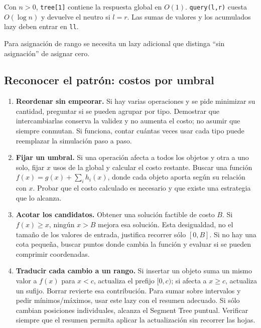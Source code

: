 Con $n>0$, \texttt{tree[1]} contiene la respuesta global en $O(1)$.
\texttt{query(l,r)} cuesta $O(\log n)$ y devuelve el neutro si $l=r$.
Las sumas de valores y los acumulados lazy deben entrar en \texttt{ll}.


Para asignaci\'on de rango se necesita un lazy adicional que distinga ``sin
asignaci\'on'' de asignar cero.

\subsection{Reconocer el patr\'on: costos por umbral}
\begin{enumerate}
\item \textbf{Reordenar sin empeorar.} Si hay varias operaciones y se pide
minimizar su cantidad, preguntar si se pueden agrupar por tipo. Demostrar
que intercambiarlas conserva la validez y no aumenta el costo; no asumir
que siempre conmutan. Si funciona, contar cu\'antas veces usar cada tipo
puede reemplazar la simulaci\'on paso a paso.
\item \textbf{Fijar un umbral.} Si una operaci\'on afecta a todos los objetos
y otra a uno solo, fijar $x$ usos de la global y calcular el costo restante.
Buscar una funci\'on $f(x)=g(x)+\sum_i h_i(x)$, donde cada objeto aporta
seg\'un su relaci\'on con $x$. Probar que el costo calculado es necesario y
que existe una estrategia que lo alcanza.
\item \textbf{Acotar los candidatos.} Obtener una soluci\'on factible de
costo $B$. Si $f(x)\ge x$, ning\'un $x>B$ mejora esa soluci\'on. Esta
desigualdad, no el tama\~no de los valores de entrada, justifica recorrer
s\'olo $[0,B]$. Si no hay una cota peque\~na, buscar puntos donde cambia la
funci\'on y evaluar si se pueden comprimir coordenadas.
\item \textbf{Traducir cada cambio a un rango.} Si insertar un objeto suma
un mismo valor a $f(x)$ para $x<c$, actualiza el prefijo $[0,c)$; si afecta
a $x\ge c$, actualiza un sufijo. Borrar revierte esa contribuci\'on. Para
sumar sobre intervalos y pedir m\'inimos/m\'aximos, usar este lazy con el
resumen adecuado. Si s\'olo cambian posiciones individuales, alcanza el
Segment Tree puntual. Verificar siempre que el resumen permita aplicar
la actualizaci\'on sin recorrer las hojas.
\end{enumerate}

